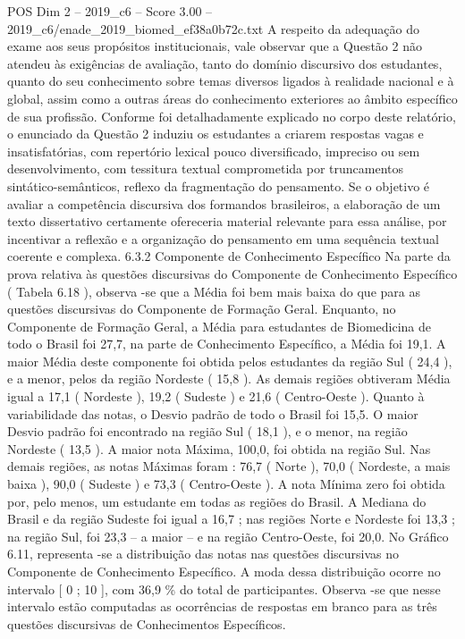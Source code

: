 \begin{textsample}{POS Dim 2 – 2019\_c6 – Score 3.00 – 2019\_c6/enade\_2019\_biomed\_ef38a0b72c.txt}
A respeito da adequação do exame aos seus propósitos institucionais, vale observar que a Questão 2 não atendeu às exigências de avaliação, tanto do domínio discursivo dos estudantes, quanto do seu conhecimento sobre temas diversos ligados à realidade nacional e à global, assim como a outras áreas do conhecimento exteriores ao âmbito específico de sua profissão.
Conforme foi detalhadamente explicado no corpo deste relatório, o enunciado da Questão 2 induziu os estudantes a criarem respostas vagas e insatisfatórias, com repertório lexical pouco diversificado, impreciso ou sem desenvolvimento, com tessitura textual comprometida por truncamentos sintático-semânticos, reflexo da fragmentação do pensamento.
Se o objetivo é avaliar a competência discursiva dos formandos brasileiros, a elaboração de um texto dissertativo certamente ofereceria material relevante para essa análise, por incentivar a reflexão e a organização do pensamento em uma sequência textual coerente e complexa. 6.3.2 Componente de Conhecimento Específico Na parte da prova relativa às questões discursivas do Componente de Conhecimento Específico ( Tabela 6.18 ), observa -se que a Média foi bem mais baixa do que para as questões discursivas do Componente de Formação Geral.
Enquanto, no Componente de Formação Geral, a Média para estudantes de Biomedicina de todo o Brasil foi 27,7, na parte de Conhecimento Específico, a Média foi 19,1.
A maior Média deste componente foi obtida pelos estudantes da região Sul ( 24,4 ), e a menor, pelos da região Nordeste ( 15,8 ).
As demais regiões obtiveram Média igual a 17,1 ( Nordeste ), 19,2 ( Sudeste ) e 21,6 ( Centro-Oeste ).
Quanto à variabilidade das notas, o Desvio padrão de todo o Brasil foi 15,5.
O maior Desvio padrão foi encontrado na região Sul ( 18,1 ), e o menor, na região Nordeste ( 13,5 ).
A maior nota Máxima, 100,0, foi obtida na região Sul.
Nas demais regiões, as notas Máximas foram : 76,7 ( Norte ), 70,0 ( Nordeste, a mais baixa ), 90,0 ( Sudeste ) e 73,3 ( Centro-Oeste ).
A nota Mínima zero foi obtida por, pelo menos, um estudante em todas as regiões do Brasil.
A Mediana do Brasil e da região Sudeste foi igual a 16,7 ; nas regiões Norte e Nordeste foi 13,3 ; na região Sul, foi 23,3 – a maior – e na região Centro-Oeste, foi 20,0.
No Gráfico 6.11, representa -se a distribuição das notas nas questões discursivas no Componente de Conhecimento Específico.
A moda dessa distribuição ocorre no intervalo [ 0 ; 10 ], com 36,9 \% do total de participantes.
Observa -se que nesse intervalo estão computadas as ocorrências de respostas em branco para as três questões discursivas de Conhecimentos Específicos.

\end{textsample}
